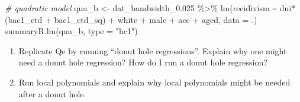 \documentclass[
  11pt,
]{article}
\newenvironment{Shaded}{\begin{snugshade}}{\end{snugshade}}
\newcommand{\AttributeTok}[1]{\textcolor[rgb]{0.77,0.63,0.00}{#1}}
\newcommand{\CommentTok}[1]{\textcolor[rgb]{0.56,0.35,0.01}{\textit{#1}}}
\newcommand{\FloatTok}[1]{\textcolor[rgb]{0.00,0.00,0.81}{#1}}
\newcommand{\FunctionTok}[1]{\textcolor[rgb]{0.00,0.00,0.00}{#1}}
\newcommand{\NormalTok}[1]{#1}
\newcommand{\OtherTok}[1]{\textcolor[rgb]{0.56,0.35,0.01}{#1}}
\newcommand{\SpecialCharTok}[1]{\textcolor[rgb]{0.00,0.00,0.00}{#1}}
\newcommand{\StringTok}[1]{\textcolor[rgb]{0.31,0.60,0.02}{#1}}
\providecommand{\tightlist}{%
  \setlength{\itemsep}{0pt}\setlength{\parskip}{0pt}}
\begin{document}
\begin{Shaded}
\begin{Highlighting}[]
\CommentTok{\# quadratic model}
\NormalTok{qua\_b }\OtherTok{\textless{}{-}} 
\NormalTok{  dat\_bandwidth\_0}\FloatTok{.025} \SpecialCharTok{\%\textgreater{}\%} 
  \FunctionTok{lm}\NormalTok{(recidivism }\SpecialCharTok{\textasciitilde{}}\NormalTok{ dui}\SpecialCharTok{*}\NormalTok{(bac1\_ctd }\SpecialCharTok{+}\NormalTok{ bac1\_ctd\_sq) }\SpecialCharTok{+}\NormalTok{ white }\SpecialCharTok{+}\NormalTok{ male }\SpecialCharTok{+}\NormalTok{ acc }\SpecialCharTok{+}\NormalTok{ aged,}
     \AttributeTok{data =}\NormalTok{ .)}
\FunctionTok{summaryR.lm}\NormalTok{(qua\_b, }\AttributeTok{type =} \StringTok{"hc1"}\NormalTok{)}
\end{Highlighting}
\end{Shaded}

\begin{enumerate}
\def\labelenumi{\arabic{enumi}.}
\setcounter{enumi}{3}
\tightlist
\item
  Replicate Qe by running ``donut hole regressions''. Explain why one
  might need a donut hole regression? How do I run a donut hole
  regression?
\item
  Run local polynomials and explain why local polynomials might be
  needed after a donut hole.
\end{enumerate}
\end{document}
